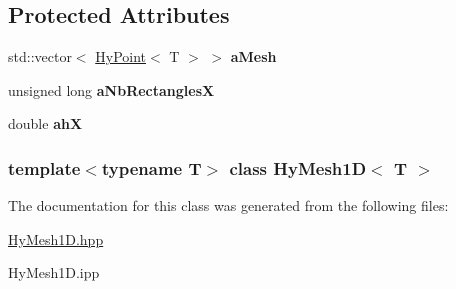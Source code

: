 \subsection*{Protected Attributes}
\begin{DoxyCompactItemize}
\item 
\hypertarget{classHyMesh1D_a4518a7522f676f60cdb291cd293db150}{
std::vector$<$ \hyperlink{classHyPoint}{HyPoint}$<$ T $>$ $>$ {\bfseries aMesh}}
\label{classHyMesh1D_a4518a7522f676f60cdb291cd293db150}

\item 
\hypertarget{classHyMesh1D_a89436efe296366f4373d29587b6acc49}{
unsigned long {\bfseries aNbRectanglesX}}
\label{classHyMesh1D_a89436efe296366f4373d29587b6acc49}

\item 
\hypertarget{classHyMesh1D_a3f97f02064dc0c71d53cc62ed13ba1f5}{
double {\bfseries ahX}}
\label{classHyMesh1D_a3f97f02064dc0c71d53cc62ed13ba1f5}

\end{DoxyCompactItemize}
\subsubsection*{template$<$typename T$>$ class HyMesh1D$<$ T $>$}



The documentation for this class was generated from the following files:\begin{DoxyCompactItemize}
\item 
\hyperlink{HyMesh1D_8hpp}{HyMesh1D.hpp}\item 
HyMesh1D.ipp\end{DoxyCompactItemize}
